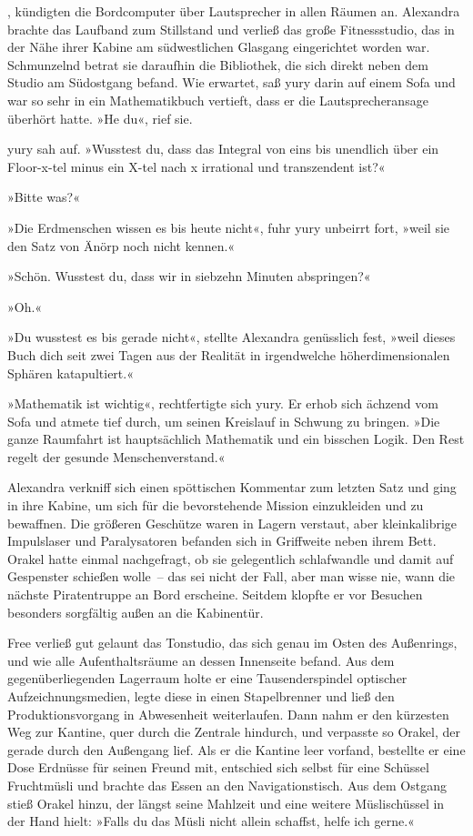 , kündigten die Bordcomputer über Lautsprecher in allen Räumen an. Alexandra brachte das Laufband zum Stillstand und verließ das große Fitnessstudio, das in der Nähe ihrer Kabine am südwestlichen Glasgang eingerichtet worden war. Schmunzelnd betrat sie daraufhin die Bibliothek, die sich direkt neben dem Studio am Südostgang befand. Wie erwartet, saß yury darin auf einem Sofa und war so sehr in ein Mathematikbuch vertieft, dass er die Lautsprecheransage überhört hatte. »He du«, rief sie.

yury sah auf. »Wusstest du, dass das Integral von eins bis unendlich über ein Floor-x-tel minus ein X-tel nach x irrational und transzendent ist?«

»Bitte was?«

»Die Erdmenschen wissen es bis heute nicht«, fuhr yury unbeirrt fort, »weil sie den Satz von Änörp noch nicht kennen.«

»Schön. Wusstest du, dass wir in siebzehn Minuten abspringen?«

»Oh.«

»Du wusstest es bis gerade nicht«, stellte Alexandra genüsslich fest, »weil dieses Buch dich seit zwei Tagen aus der Realität in irgendwelche höherdimensionalen Sphären katapultiert.«

»Mathematik ist wichtig«, rechtfertigte sich yury. Er erhob sich ächzend vom Sofa und atmete tief durch, um seinen Kreislauf in Schwung zu bringen. »Die ganze Raumfahrt ist hauptsächlich Mathematik und ein bisschen Logik. Den Rest regelt der gesunde Menschenverstand.«

Alexandra verkniff sich einen spöttischen Kommentar zum letzten Satz und ging in ihre Kabine, um sich für die bevorstehende Mission einzukleiden und zu bewaffnen. Die größeren Geschütze waren in Lagern verstaut, aber kleinkalibrige Impulslaser und Paralysatoren befanden sich in Griffweite neben ihrem Bett. Orakel hatte einmal nachgefragt, ob sie gelegentlich schlafwandle und damit auf Gespenster schießen wolle~– das sei nicht der Fall, aber man wisse nie, wann die nächste Piratentruppe an Bord erscheine. Seitdem klopfte er vor Besuchen besonders sorgfältig außen an die Kabinentür.

Free verließ gut gelaunt das Tonstudio, das sich genau im Osten des Außenrings, und wie alle Aufenthaltsräume an dessen Innenseite befand. Aus dem gegenüberliegenden Lagerraum holte er eine Tausenderspindel optischer Aufzeichnungsmedien, legte diese in einen Stapelbrenner und ließ den Produktionsvorgang in Abwesenheit weiterlaufen. Dann nahm er den kürzesten Weg zur Kantine, quer durch die Zentrale hindurch, und verpasste so Orakel, der gerade durch den Außengang lief. Als er die Kantine leer vorfand, bestellte er eine Dose Erdnüsse für seinen Freund mit, entschied sich selbst für eine Schüssel Fruchtmüsli und brachte das Essen an den Navigationstisch. Aus dem Ostgang stieß Orakel hinzu, der längst seine Mahlzeit und eine weitere Müslischüssel in der Hand hielt: »Falls du das Müsli nicht allein schaffst, helfe ich gerne.«


